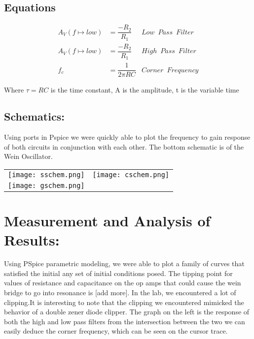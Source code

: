 \documentclass[10pt,a4paper]{article}
\begin{document}
\subsection{Equations}
 
\begin{align}
A_{V}(f \longmapsto low) &= \dfrac{-R_{2}}{R_{1}}  & Low \enspace Pass  \enspace Filter \\
A_{V}(f \longmapsto low) &= \dfrac{-R_{2}}{R_{1}}  & High \enspace Pass  \enspace Filter \\
f_{c} &=\dfrac{1}{2\pi RC} & Corner \enspace Frequency 
\end{align}


\begin{flushright}
Where $\tau = RC $ is the time constant, A is the amplitude, t is the variable time \

\end{flushright}

\pagebreak
\subsection{Schematics:}
Using ports in Pspice we were quickly able to plot the frequency to gain response of both circuits in conjunction with each other. The bottom schematic is of the Wein Oscillator.\\
\begin{tabular}{l l}

\texttt{[image: sschem.png]} & \texttt{[image: cschem.png]} \\ 
\multicolumn{2}{l}{\texttt{[image: gschem.png]}} \\ 
\end{tabular} 



\section*{Measurement and Analysis of Results:}
Using PSpice parametric modeling, we were able to plot a family of curves that satisfied the initial any set of initial conditions posed. The tipping point for values of resistance and capacitance on the op amps that could cause the wein bridge to go into resonance is [add more]. In the lab, we encountered a lot of clipping.It is interesting to note that the clipping we encountered mimicked the behavior of a double zener diode clipper. The graph on the left is the response of both the high and low pass filters from the intersection between the two we can easily deduce the corner frequency, which can be seen on the cursor trace.
\end{document}
